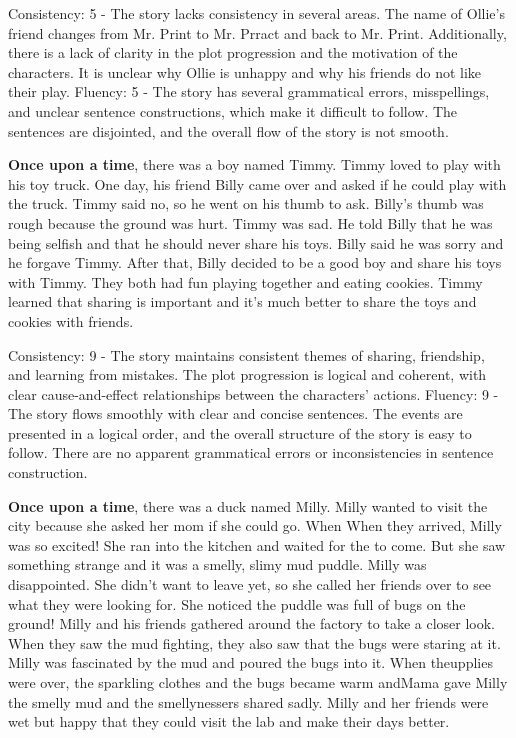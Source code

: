 \documentclass{article}
\begin{document}
Consistency: 5 - The story lacks consistency in several areas. The name of Ollie's friend changes from Mr. Print to Mr. Prract and back to Mr. Print. Additionally, there is a lack of clarity in the plot progression and the motivation of the characters. It is unclear why Ollie is unhappy and why his friends do not like their play.
Fluency: 5 - The story has several grammatical errors, misspellings, and unclear sentence constructions, which make it difficult to follow. The sentences are disjointed, and the overall flow of the story is not smooth.

\textbf{Once upon a time}, there was a boy named Timmy. Timmy loved to play with his toy truck. One day, his friend Billy came over and asked if he could play with the truck. Timmy said no, so he went on his thumb to ask. Billy's thumb was rough because the ground was hurt. Timmy was sad. He told Billy that he was being selfish and that he should never share his toys. Billy said he was sorry and he forgave Timmy. After that, Billy decided to be a good boy and share his toys with Timmy. They both had fun playing together and eating cookies. Timmy learned that sharing is important and it's much better to share the toys and cookies with friends.

Consistency: 9 - The story maintains consistent themes of sharing, friendship, and learning from mistakes. The plot progression is logical and coherent, with clear cause-and-effect relationships between the characters' actions.
Fluency: 9 - The story flows smoothly with clear and concise sentences. The events are presented in a logical order, and the overall structure of the story is easy to follow. There are no apparent grammatical errors or inconsistencies in sentence construction.

\textbf{Once upon a time}, there was a duck named Milly. Milly wanted to visit the city because she asked her mom if she could go. When When they arrived, Milly was so excited! She ran into the kitchen and waited for the to come. But she saw something strange and it was a smelly, slimy mud puddle. Milly was disappointed. She didn't want to leave yet, so she called her friends over to see what they were looking for. She noticed the puddle was full of bugs on the ground! Milly and his friends gathered around the factory to take a closer look. When they saw the mud fighting, they also saw that the bugs were staring at it. Milly was fascinated by the mud and poured the bugs into it. When theupplies were over, the sparkling clothes and the bugs became warm andMama gave Milly the smelly mud and the smellynessers shared sadly. Milly and her friends were wet but happy that they could visit the lab and make their days better.
\end{document}
